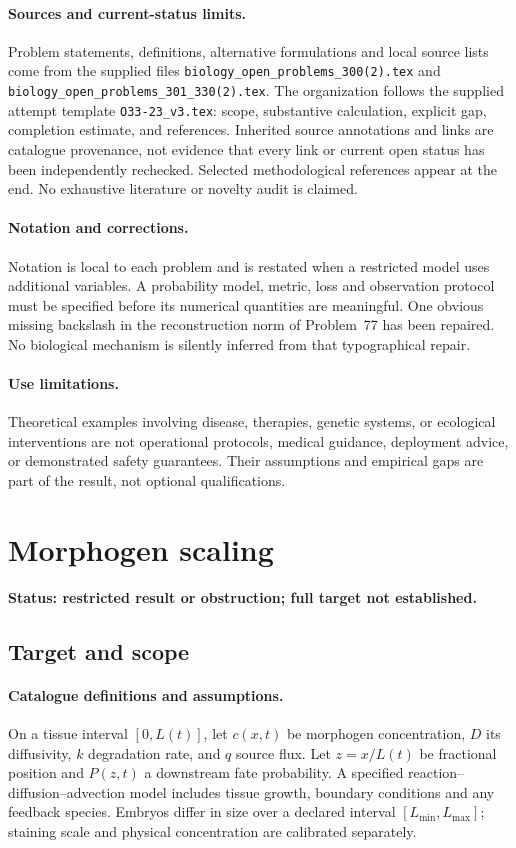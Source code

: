 \documentclass[11pt]{article}
\begin{document}
\paragraph{Sources and current-status limits.}
Problem statements, definitions, alternative formulations and local source lists
come from the supplied files
\texttt{biology\_open\_problems\_300(2).tex} and
\texttt{biology\_open\_problems\_301\_330(2).tex}.
The organization follows the supplied attempt template
\texttt{O33-23\_v3.tex}: scope, substantive calculation, explicit gap,
completion estimate, and references. Inherited source annotations and links are
catalogue provenance, not evidence that every link or current open status has
been independently rechecked. Selected methodological references appear at the
end. No exhaustive literature or novelty audit is claimed.

\paragraph{Notation and corrections.}
Notation is local to each problem and is restated when a restricted model uses
additional variables. A probability model, metric, loss and observation protocol
must be specified before its numerical quantities are meaningful. One obvious
missing backslash in the reconstruction norm of Problem~77 has been repaired.
No biological mechanism is silently inferred from that typographical repair.

\paragraph{Use limitations.}
Theoretical examples involving disease, therapies, genetic systems, or ecological
interventions are not operational protocols, medical guidance, deployment advice,
or demonstrated safety guarantees. Their assumptions and empirical gaps are part
of the result, not optional qualifications.


\section*{Morphogen scaling}
\label{prob:122}
\noindent\textbf{Status: restricted result or obstruction; full target not established.}
\subsection{Target and scope}
\paragraph{Catalogue definitions and assumptions.}
On a tissue interval $[0,L(t)]$, let $c(x,t)$ be morphogen concentration, $D$ its diffusivity, $k$ degradation rate, and $q$ source flux. Let $z=x/L(t)$ be fractional position and $P(z,t)$ a downstream fate probability. A specified reaction--diffusion--advection model includes tissue growth, boundary conditions and any feedback species. Embryos differ in size over a declared interval $[L_{\min},L_{\max}]$; staining scale and physical concentration are calibrated separately.
\end{document}
